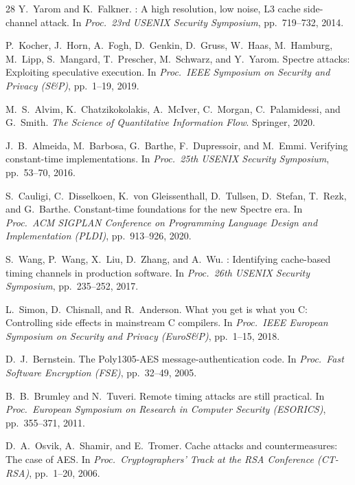 \documentclass{article}
\theoremstyle{definition}
\theoremstyle{remark}
\begin{document}
\begin{thebibliography}{28}
Y.~Yarom and K.~Falkner.
: A high resolution, low noise, {L3} cache
  side-channel attack.
\newblock In \emph{Proc.\ 23rd USENIX Security Symposium}, pp.\ 719--732,
  2014.

P.~Kocher, J.~Horn, A.~Fogh, D.~Genkin, D.~Gruss, W.~Haas, M.~Hamburg,
  M.~Lipp, S.~Mangard, T.~Prescher, M.~Schwarz, and Y.~Yarom.
\newblock Spectre attacks: Exploiting speculative execution.
\newblock In \emph{Proc.\ IEEE Symposium on Security and Privacy (S\&P)},
  pp.\ 1--19, 2019.

M.~S.~Alvim, K.~Chatzikokolakis, A.~McIver, C.~Morgan, C.~Palamidessi, and
  G.~Smith.
\newblock \emph{The Science of Quantitative Information Flow}.
\newblock Springer, 2020.

J.~B.~Almeida, M.~Barbosa, G.~Barthe, F.~Dupressoir, and M.~Emmi.
\newblock Verifying constant-time implementations.
\newblock In \emph{Proc.\ 25th USENIX Security Symposium},
  pp.\ 53--70, 2016.

S.~Cauligi, C.~Disselkoen, K.~von Gleissenthall, D.~Tullsen,
  D.~Stefan, T.~Rezk, and G.~Barthe.
\newblock Constant-time foundations for the new {Spectre} era.
\newblock In \emph{Proc.\ ACM SIGPLAN Conference on Programming Language
  Design and Implementation (PLDI)}, pp.\ 913--926, 2020.

S.~Wang, P.~Wang, X.~Liu, D.~Zhang, and A.~Wu.
: Identifying cache-based timing channels in production
  software.
\newblock In \emph{Proc.\ 26th USENIX Security Symposium},
  pp.\ 235--252, 2017.

L.~Simon, D.~Chisnall, and R.~Anderson.
\newblock What you get is what you {C}: Controlling side effects in mainstream
  {C} compilers.
\newblock In \emph{Proc.\ IEEE European Symposium on Security and Privacy
  (EuroS\&P)}, pp.\ 1--15, 2018.

D.~J.~Bernstein.
\newblock The {Poly1305-AES} message-authentication code.
\newblock In \emph{Proc.\ Fast Software Encryption (FSE)},
  pp.\ 32--49, 2005.

B.~B.~Brumley and N.~Tuveri.
\newblock Remote timing attacks are still practical.
\newblock In \emph{Proc.\ European Symposium on Research in Computer Security
  (ESORICS)}, pp.\ 355--371, 2011.

D.~A.~Osvik, A.~Shamir, and E.~Tromer.
\newblock Cache attacks and countermeasures: The case of {AES}.
\newblock In \emph{Proc.\ Cryptographers' Track at the RSA Conference
  (CT-RSA)}, pp.\ 1--20, 2006.


\end{thebibliography}
\end{document}
